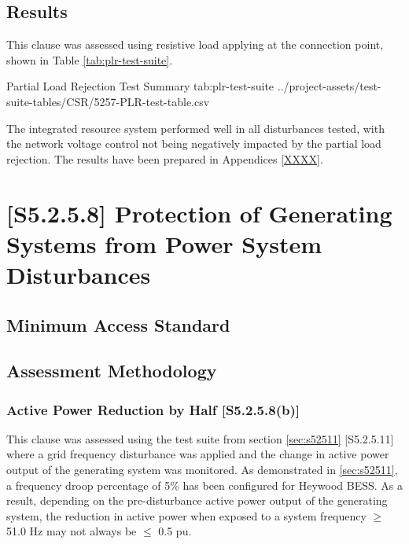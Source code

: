 \documentclass{../grid-link-report}
\newcommand{\projectassetsdir}{../project-assets}
\begin{document}
	
	
	\subsection{Results}
	
	This clause was assessed using resistive load applying at the connection point, shown in Table \ref{tab:plr-test-suite}.
	
		{
		\fontsize{7}{9}\selectfont
		\autoscaledlongtable
		{Partial Load Rejection Test Summary}
		{tab:plr-test-suite}
		{\projectassetsdir/test-suite-tables/CSR/5257-PLR-test-table.csv}
	}

	The integrated resource system performed well in all disturbances tested, with the network voltage control not being negatively impacted by the partial load rejection. The results have been prepared in Appendices \ref{XXXX}.
	
	\section{[S5.2.5.8] Protection of Generating Systems from Power System Disturbances}
	\subsection{Minimum Access Standard}
	\begin{tcolorbox}[lightgreenbox]
		
	\end{tcolorbox}
	\subsection{Assessment Methodology}

	\subsubsection{Active Power Reduction by Half [S5.2.5.8(b)]}
	This clause was assessed using the test suite from section \ref{sec:s52511} [S5.2.5.11] where a grid frequency disturbance was applied and the change in active power output of the generating system was monitored. As demonstrated in \ref{sec:s52511}, a frequency droop percentage of 5\% has been configured for Heywood BESS. As a result, depending on the pre-disturbance active power output of the generating system, the reduction in active power when exposed to a system frequency $\geq$ 51.0 Hz may not always be $\leq$ 0.5 pu.
	
\end{document}
